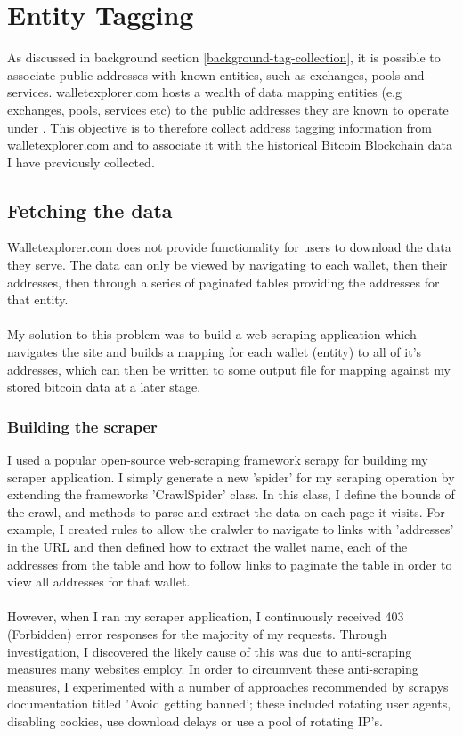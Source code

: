 \chapter{Entity Tagging}\label{section-entity-tagging}
As discussed in background section \ref{background-tag-collection}, it is possible to associate public addresses with known entities, such as exchanges, pools and services. walletexplorer.com hosts a wealth of data mapping entities (e.g exchanges, pools, services etc) to the public addresses they are known to operate under \cite{RefWorks:doc:5c4b26f3e4b0ea619646d513}. This objective is to therefore collect address tagging information from walletexplorer.com and to associate it with the historical Bitcoin Blockchain data I have previously collected.

\section{Fetching the data}\label{design:fetch-entity-data}
Walletexplorer.com does not provide functionality for users to download the data they serve. The data can only be viewed by navigating to each wallet, then their addresses, then through a series of paginated tables providing the addresses for that entity.
\\\\
My solution to this problem was to build a web scraping application which navigates the site and builds a mapping for each wallet (entity) to all of it's addresses, which can then be written to some output file for mapping against my stored bitcoin data at a later stage. 

\subsection{Building the scraper}
I used a popular open-source web-scraping framework scrapy for building my scraper application. I simply generate a new 'spider' for my scraping operation by extending the frameworks 'CrawlSpider' class. In this class, I define the bounds of the crawl, and methods to parse and extract the data on each page it visits. For example, I created rules to allow the cralwler to navigate to links with 'addresses' in the URL and then defined how to extract the wallet name,  each of the addresses from the table and how to follow links to paginate the table in order to view all addresses for that wallet. 
\\\\
However, when I ran my scraper application, I continuously received 403 (Forbidden) error responses for the majority of my requests.  Through investigation, I discovered the likely cause of this was due to anti-scraping measures many websites employ. In order to circumvent these anti-scraping measures, I experimented with a number of approaches recommended by scrapys documentation titled 'Avoid getting banned'; these included rotating user agents, disabling cookies, use download delays or use a pool of rotating IP's. 

